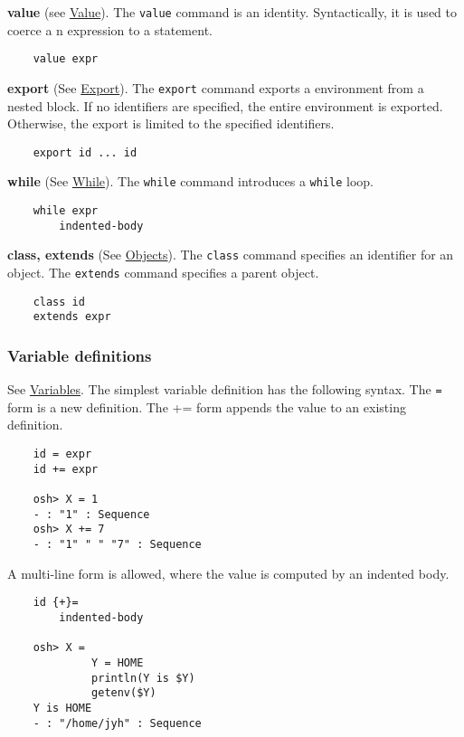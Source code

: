 \textbf{value} (see \href{omake-language#functions}{Value}).  The \verb+value+ command is an identity.
Syntactically, it is used to coerce a n expression to a statement.

\begin{verbatim}
    value expr
\end{verbatim}

\textbf{export} (See \href{omake-language.html#export}{Export}).  The \verb+export+ command exports
a environment from a nested block.  If no identifiers are specified, the entire environment is exported.
Otherwise, the export is limited to the specified identifiers.

\begin{verbatim}
    export id ... id
\end{verbatim}

\textbf{while} (See \href{omake-base.html#while}{While}).  The \verb+while+ command introduces a \verb+while+ loop.

\begin{verbatim}
    while expr
        indented-body
\end{verbatim}

\textbf{class, extends} (See \href{omake-language.html#objects}{Objects}).  The \verb+class+ command
specifies an identifier for an object.  The \verb+extends+ command specifies a parent object.

\begin{verbatim}
    class id
    extends expr
\end{verbatim}

\subsubsection{Variable definitions}

See \href{omake-language.html#variables}{Variables}.  The simplest variable definition has the
following syntax.  The \verb+=+ form is a new definition.  The += form appends the value to
an existing definition.

\begin{verbatim}
    id = expr
    id += expr

    osh> X = 1
    - : "1" : Sequence
    osh> X += 7
    - : "1" " " "7" : Sequence
\end{verbatim}

A multi-line form is allowed, where the value is computed by an indented body.

\begin{verbatim}
    id {+}=
        indented-body

    osh> X =
             Y = HOME
             println(Y is $Y)
             getenv($Y)
    Y is HOME
    - : "/home/jyh" : Sequence
\end{verbatim}

